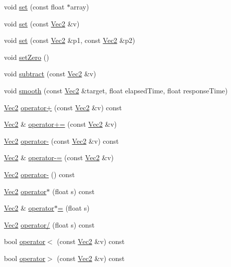 \begin{DoxyCompactItemize}
\item 
void \hyperlink{classVec2_a492bf35fe6975aebe475519f21d86364}{set} (const float $\ast$array)
\item 
void \hyperlink{classVec2_a2c4e29e470c177b19c8f2ccaee8d6185}{set} (const \hyperlink{classVec2}{Vec2} \&v)
\item 
void \hyperlink{classVec2_a4e76b9c6df8c81a4035107961d670caf}{set} (const \hyperlink{classVec2}{Vec2} \&p1, const \hyperlink{classVec2}{Vec2} \&p2)
\item 
void \hyperlink{classVec2_aa39a7344e5af312b4aa88fdf21aa5369}{set\+Zero} ()
\item 
void \hyperlink{classVec2_a16a3531b2ccb1517fde0f43bfaf7364c}{subtract} (const \hyperlink{classVec2}{Vec2} \&v)
\item 
void \hyperlink{classVec2_a6e37c8d6604b45cc5206ea64ac2d4c77}{smooth} (const \hyperlink{classVec2}{Vec2} \&target, float elapsed\+Time, float response\+Time)
\item 
\hyperlink{classVec2}{Vec2} \hyperlink{classVec2_ad2383d77974a8092b149391c2edce7fd}{operator+} (const \hyperlink{classVec2}{Vec2} \&v) const
\item 
\hyperlink{classVec2}{Vec2} \& \hyperlink{classVec2_a7f062667506f94bc207bdf492ca5b89c}{operator+=} (const \hyperlink{classVec2}{Vec2} \&v)
\item 
\hyperlink{classVec2}{Vec2} \hyperlink{classVec2_afea5a75f39e0db3d893aa56f11e90a60}{operator-\/} (const \hyperlink{classVec2}{Vec2} \&v) const
\item 
\hyperlink{classVec2}{Vec2} \& \hyperlink{classVec2_af4a567f4055cde891fa22a17c8a3dccc}{operator-\/=} (const \hyperlink{classVec2}{Vec2} \&v)
\item 
\hyperlink{classVec2}{Vec2} \hyperlink{classVec2_ae96b9fc7ac393b36eae80d141d9f8819}{operator-\/} () const
\item 
\hyperlink{classVec2}{Vec2} \hyperlink{classVec2_aac30b50a35381a11b76b89ea19dc7f12}{operator$\ast$} (float s) const
\item 
\hyperlink{classVec2}{Vec2} \& \hyperlink{classVec2_a579a80f68497014e300b45b9824998a1}{operator$\ast$=} (float s)
\item 
\hyperlink{classVec2}{Vec2} \hyperlink{classVec2_a30794ad88645e3d0279e8253e4355e8d}{operator/} (float s) const
\item 
bool \hyperlink{classVec2_aad24b95fb51746343f06c504a7a05681}{operator$<$} (const \hyperlink{classVec2}{Vec2} \&v) const
\item 
bool \hyperlink{classVec2_a40d9c6d4290844d86f27cb76fb8a3556}{operator$>$} (const \hyperlink{classVec2}{Vec2} \&v) const

\end{DoxyCompactItemize}
